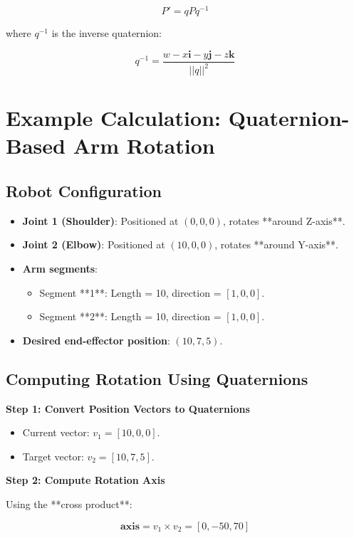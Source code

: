 \documentclass{article}
\begin{document}
\[
P' = q P q^{-1}
\]



where \( q^{-1} \) is the inverse quaternion:



\[
q^{-1} = \frac{w - x\mathbf{i} - y\mathbf{j} - z\mathbf{k}}{||q||^2}
\]



\section{Example Calculation: Quaternion-Based Arm Rotation}
\subsection{Robot Configuration}
\begin{itemize}
    \item \textbf{Joint 1 (Shoulder)}: Positioned at \( (0, 0, 0) \), rotates **around Z-axis**.
    \item \textbf{Joint 2 (Elbow)}: Positioned at \( (10, 0, 0) \), rotates **around Y-axis**.
    \item \textbf{Arm segments}:
        \begin{itemize}
            \item Segment **1**: Length = 10, direction = \([1, 0, 0]\).
            \item Segment **2**: Length = 10, direction = \([1, 0, 0]\).
        \end{itemize}
    \item \textbf{Desired end-effector position}: \( (10, 7, 5) \).
\end{itemize}

\subsection{Computing Rotation Using Quaternions}
\textbf{Step 1: Convert Position Vectors to Quaternions}

\begin{itemize}
    \item Current vector: \( v_1 = [10, 0, 0] \).
    \item Target vector: \( v_2 = [10, 7, 5] \).
\end{itemize}

\textbf{Step 2: Compute Rotation Axis}

Using the **cross product**:



\[
\mathbf{axis} = v_1 \times v_2 = [0, -50, 70]
\]
\end{document}
